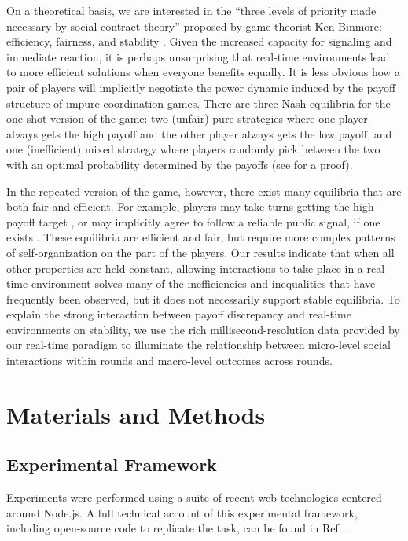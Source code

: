 \documentclass[10pt,letterpaper]{article}
\begin{document}
On a theoretical basis, we are interested in the ``three levels of priority made necessary by social contract theory'' proposed by game theorist Ken Binmore: efficiency, fairness, and stability \cite{Binmore05_NaturalJustice}. Given the increased capacity for signaling and immediate reaction, it is perhaps unsurprising that real-time environments lead to more efficient solutions when everyone benefits equally. It is less obvious how a pair of players will implicitly negotiate the power dynamic induced by the payoff structure of impure coordination games. There are three Nash equilibria for the one-shot version of the game: two (unfair) pure strategies where one player always gets the high payoff and the other player always gets the low payoff, and one (inefficient) mixed strategy where players randomly pick between the two with an optimal probability determined by the payoffs (see  for a proof).

In the repeated version of the game, however, there exist many equilibria that are both fair and efficient. For example, players may take turns getting the high payoff target \cite{VanderschraafSkyrms03_LearningToTakeTurns, HelbingSchonhofStark05_EmpiricalTurnTaking, LauMui08_TurnTakingBattleOfTheSexes}, or may implicitly agree to follow a reliable public signal, if one exists \cite{ Aumann74_CorrelativeEquilibria, GintisHelbing13_HomoSocialis}. These equilibria are efficient and fair, but require more complex patterns of self-organization on the part of the players. Our results indicate that when all other properties are held constant, allowing interactions to take place in a real-time environment solves many of the inefficiencies and inequalities that have frequently been observed, but it does not necessarily support stable equilibria. To explain the strong interaction between payoff discrepancy and real-time environments on stability, we use the rich millisecond-resolution data provided by our real-time paradigm to illuminate the  relationship between micro-level social interactions within rounds and macro-level outcomes across rounds. 


\section*{Materials and Methods}

\subsection*{Experimental Framework}
Experiments were performed  using a suite of recent web technologies centered around Node.js. A full technical account of this experimental framework, including open-source code to replicate the task, can be found in Ref. \cite{Hawkins14_RealTimeWebExperiments}. 
\end{document}
